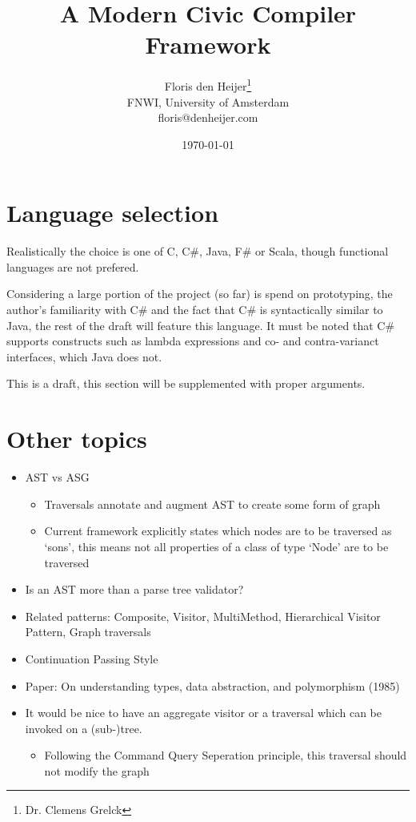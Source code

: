 \documentclass[final,a4paper,12pt]{article}
\author{Floris den Heijer\thanks{Dr. Clemens Grelck}\\
 FNWI, University of Amsterdam\\
 floris@denheijer.com}
\date{\today}
\title{A Modern Civic Compiler Framework}
\begin{document}
\maketitle
\clearpage

\tableofcontents
\clearpage

\section*{Language selection}
Realistically the choice is one of C, C\#, Java, F\# or Scala, though functional languages are not prefered.

Considering a large portion of the project (so far) is spend on prototyping, the author's familiarity with C\# and the fact that C\# is syntactically similar to Java, the rest of the draft will feature this language. It must be noted that C\# supports constructs such as lambda expressions and co- and contra-varianct interfaces, which Java does not.

This is a draft, this section will be supplemented with proper arguments. 

\section*{Other topics}
\begin{itemize}
	\item AST vs ASG
	\begin{itemize}
		\item Traversals annotate and augment AST to create some form of graph
		\item Current framework explicitly states which nodes are to be traversed as `sons', this means not all properties of a class of type `Node' are to be traversed
	\end{itemize}
	\item Is an AST more than a parse tree validator? 
	\item Related patterns: Composite, Visitor, MultiMethod, Hierarchical Visitor Pattern, Graph traversals
	\item Continuation Passing Style
	\item Paper: On understanding types, data abstraction, and polymorphism (1985)
	\item It would be nice to have an aggregate visitor or a traversal which can be invoked on a (sub-)tree.
	\begin{itemize}
		\item Following the Command Query Seperation principle, this traversal should not modify the graph
	\end{itemize}
\end{itemize}
\clearpage
\end{document}

